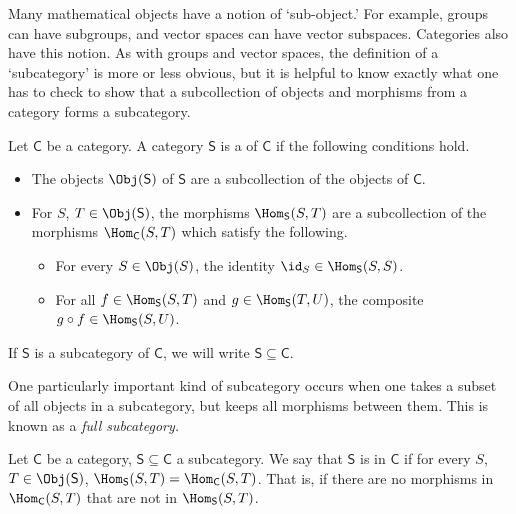 \documentclass[notes.tex]{subfiles}
\begin{document}
Many mathematical objects have a notion of `sub-object.' For example, groups can have subgroups, and vector spaces can have vector subspaces. Categories also have this notion. As with groups and vector spaces, the definition of a `subcategory' is more or less obvious, but it is helpful to know exactly what one has to check to show that a subcollection of objects and morphisms from a category forms a subcategory.

\begin{definition}[subcategory]
  \label{def:subcategory}
  Let $\mathsf{C}$ be a category. A category $\mathsf{S}$ is a  of $\mathsf{C}$ if the following conditions hold.
  \begin{itemize}
    \item The objects $\Obj(\mathsf{S})$ of $\mathsf{S}$ are a subcollection of the objects of $\mathsf{C}$.

    \item For $S$, $T \in \Obj(\mathsf{S})$, the morphisms $\Hom_{\mathsf{S}}(S, T)$ are a subcollection of the morphisms $\Hom_{\mathsf{C}}(S, T)$ which satisfy the following.
      \begin{itemize}
        \item For every $S \in \Obj(S)$, the identity $\id_{S} \in \Hom_{\mathsf{S}}(S, S)$.

        \item For all $f \in \Hom_{\mathsf{S}}(S, T)$ and $g \in \Hom_{\mathsf{S}}(T, U)$, the composite $g \circ f \in \Hom_{\mathsf{S}}(S, U)$.
      \end{itemize}
  \end{itemize}

  If $\mathsf{S}$ is a subcategory of $\mathsf{C}$, we will write $\mathsf{S} \subseteq \mathsf{C}$.
\end{definition}

One particularly important kind of subcategory occurs when one takes a subset of all objects in a subcategory, but keeps all morphisms between them. This is known as a \emph{full subcategory.}

\begin{definition}
  \label{def:fullsubcategory}
  Let $\mathsf{C}$ be a category, $\mathsf{S} \subseteq \mathsf{C}$ a subcategory. We say that $\mathsf{S}$ is  in $\mathsf{C}$ if for every $S$, $T \in \Obj(\mathsf{S})$, $\Hom_{\mathsf{S}}(S, T) = \Hom_{\mathsf{C}}(S, T)$. That is, if there are no morphisms in $\Hom_{\mathsf{C}}(S, T)$ that are not in $\Hom_{\mathsf{S}}(S, T)$.
\end{definition}
\end{document}
